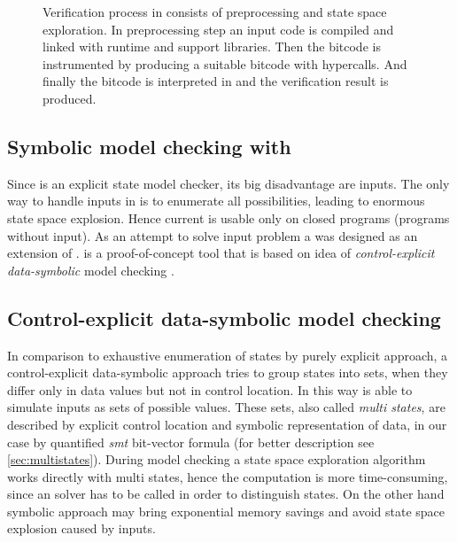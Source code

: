 \begin{figure}[!ht]
{
}
\caption{Verification process in \DIVINE consists of preprocessing and
state space exploration. In preprocessing step an input code is
compiled and linked with \DIOS runtime and \DIVINE support
libraries. Then the bitcode is instrumented by \LART producing a suitable \LLVM bitcode with \DIVM hypercalls. And finally the bitcode is interpreted in \DIVM and the verification result is produced.}\label{fig:verification}
\end{figure}

\subsection{Symbolic model checking with \SymDIVINE}

Since \DIVINE is an explicit state model checker, its big disadvantage are inputs. The
only way to handle inputs in \DIVINE is to enumerate all possibilities, leading to
enormous state space explosion. Hence current \DIVINE is usable only on
closed programs (programs without input). As an attempt to solve input problem a
\SymDIVINE was designed as an extension of \DIVINE. \SymDIVINE is
a proof-of-concept tool that is based on idea of \emph{control-explicit data-symbolic}
model checking \cite{Barnat14}.

\subsection{Control-explicit data-symbolic model checking}

In comparison to exhaustive enumeration of states by purely explicit approach, a
control-explicit data-symbolic approach tries to group states into sets, when
they differ only in data values but not in control location. In this way \SymDIVINE is able to
simulate inputs as sets of possible values. These sets, also called \emph{multi states}, are described by explicit control location and symbolic representation of
data, in our case by quantified \emph{smt} bit-vector formula (for better description see
\autoref{sec:multistates}). During model checking a state space exploration
algorithm works directly with multi states, hence the computation is more
time-consuming, since an \SMT solver has to be called in order to
distinguish states. On the other hand symbolic approach may bring
exponential memory savings and avoid state space explosion caused by inputs.

